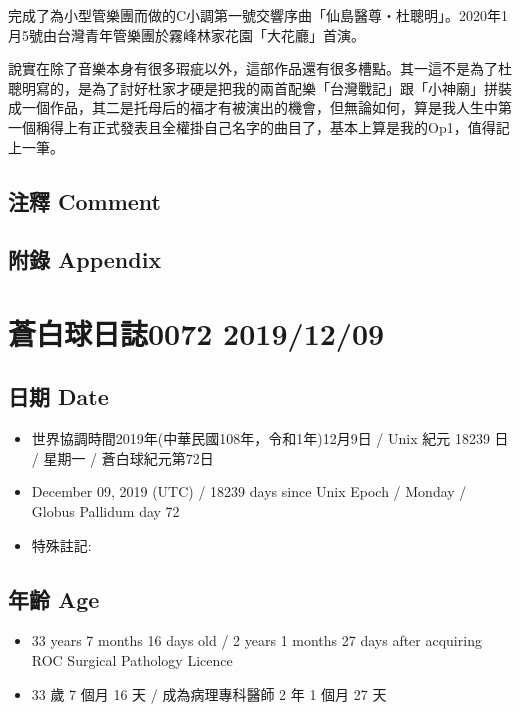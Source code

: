 \documentclass[a5paper, 12pt
]{book}
\providecommand{\tightlist}{%
  \setlength{\itemsep}{0pt}\setlength{\parskip}{0pt}}
\begin{document}
完成了為小型管樂團而做的C小調第一號交響序曲「仙島醫尊‧杜聰明」。2020年1月5號由台灣青年管樂團於霧峰林家花園「大花廳」首演。

說實在除了音樂本身有很多瑕疵以外，這部作品還有很多槽點。其一這不是為了杜聰明寫的，是為了討好杜家才硬是把我的兩首配樂「台灣戰記」跟「小神廟」拼裝成一個作品，其二是托母后的福才有被演出的機會，但無論如何，算是我人生中第一個稱得上有正式發表且全權掛自己名字的曲目了，基本上算是我的Op1，值得記上一筆。

\hypertarget{ux6ce8ux91cb-comment-7}{%
\subsection{注釋 Comment}\label{ux6ce8ux91cb-comment-7}}

\hypertarget{ux9644ux9304-appendix-7}{%
\subsection{附錄 Appendix}\label{ux9644ux9304-appendix-7}}

\hypertarget{ux84bcux767dux7403ux65e5ux8a8c0072-20191209}{%
\section{蒼白球日誌0072
2019/12/09}\label{ux84bcux767dux7403ux65e5ux8a8c0072-20191209}}

\hypertarget{ux65e5ux671f-date-8}{%
\subsection{日期 Date}\label{ux65e5ux671f-date-8}}

\begin{itemize}
\tightlist
\item
  世界協調時間2019年(中華民國108年，令和1年)12月9日 / Unix 紀元 18239 日
  / 星期一 / 蒼白球紀元第72日
\item
  December 09, 2019 (UTC) / 18239 days since Unix Epoch / Monday /
  Globus Pallidum day 72
\item
  特殊註記:
\end{itemize}

\hypertarget{ux5e74ux9f61-age-8}{%
\subsection{年齡 Age}\label{ux5e74ux9f61-age-8}}

\begin{itemize}
\tightlist
\item
  33 years 7 months 16 days old / 2 years 1 months 27 days after
  acquiring ROC Surgical Pathology Licence
\item
  33 歲 7 個月 16 天 / 成為病理專科醫師 2 年 1 個月 27 天
\end{itemize}
\end{document}
